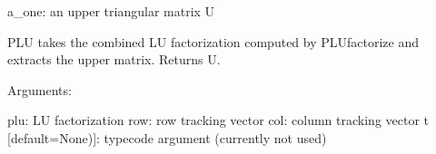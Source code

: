 \documentclass[a4paper,11pt,english]{sphinxmanual}
\begin{document}
\begin{fulllineitems}
\begin{fulllineitems}
a\_one: an upper triangular matrix U

\end{fulllineitems}


\begin{fulllineitems}
\label{modules_doc:cbmpy.PyscesStoich.Stoich.SplitLU}
PLU takes the combined LU factorization computed by PLUfactorize and extracts the upper matrix.
Returns U.

Arguments:

plu: LU factorization
row: row tracking vector
col: column tracking vector
t {[}default=None){]}: typecode argument (currently not used)

\end{fulllineitems}


\end{fulllineitems}

\end{document}
